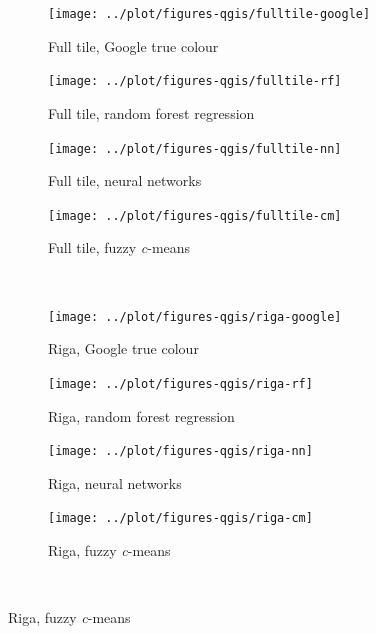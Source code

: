 \documentclass[a4paper,10pt]{book}
\begin{document}
\begin{figure}
  \centering
  \begin{subfigure}[b]{.23\textwidth}
    \texttt{[image: ../plot/figures-qgis/fulltile-google]}
    \caption{Full tile, Google true colour}
  \end{subfigure} \hfill
  \begin{subfigure}[b]{.23\textwidth}
    \texttt{[image: ../plot/figures-qgis/fulltile-rf]}
    \caption{Full tile, random forest regression}
    \label{subfig-fulltile-rf}
  \end{subfigure} \hfill
  \begin{subfigure}[b]{.23\textwidth}
    \texttt{[image: ../plot/figures-qgis/fulltile-nn]}
    \caption{Full tile, neural networks}
  \end{subfigure} \hfill
  \begin{subfigure}[b]{.23\textwidth}
    \texttt{[image: ../plot/figures-qgis/fulltile-cm]}
    \caption{Full tile, fuzzy \textit{c}-means}
    \label{subfig-fulltile-cm}
  \end{subfigure} \
  \begin{subfigure}[b]{.23\textwidth}
    \texttt{[image: ../plot/figures-qgis/riga-google]}
    \caption{Riga, Google true colour}
  \end{subfigure} \hfill
  \begin{subfigure}[b]{.23\textwidth}
    \texttt{[image: ../plot/figures-qgis/riga-rf]}
    \caption{Riga, random forest regression}
    \label{subfig-riga-rf}
  \end{subfigure} \hfill
  \begin{subfigure}[b]{.23\textwidth}
    \texttt{[image: ../plot/figures-qgis/riga-nn]}
    \caption{Riga, neural networks}
  \end{subfigure} \hfill
  \begin{subfigure}[b]{.23\textwidth}
    \texttt{[image: ../plot/figures-qgis/riga-cm]}
    \caption{Riga, fuzzy \textit{c}-means}
    \label{subfig-riga-cm}
  \end{subfigure} \
\end{figure}
\end{document}
